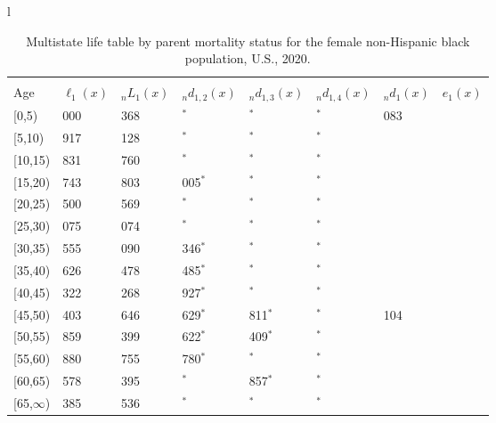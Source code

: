\documentclass[
]{article}
\begin{document}
\begin{table}
\caption{\label{tab:table-nhblack-female}Multistate life table by parent mortality status for the female non-Hispanic black population, U.S., 2020.}

\centering
\fontsize{9}{11}\selectfont
\begin{tabular}[t]{l}
\hline
\begin{tabular}{>{\raggedright\arraybackslash}p{.45in}>{\raggedleft\arraybackslash}p{.65in}>{\raggedleft\arraybackslash}p{.65in}>{\raggedleft\arraybackslash}p{.65in}>{\raggedleft\arraybackslash}p{.65in}>{\raggedleft\arraybackslash}p{.65in}>{\raggedleft\arraybackslash}p{.65in}>{\raggedleft\arraybackslash}p{.65in}}
\toprule
\multicolumn{1}{c}{ } & \multicolumn{7}{c}{(1) Lost neither} \\
\cmidrule(l{3pt}r{3pt}){2-8}
Age & $\ell_{1}(x)$ & ${}_nL_{1}(x)$ & ${}_nd_{1,2}(x)$ & ${}_nd_{1,3}(x)$ & ${}_nd_{1,4}(x)$ & ${}_nd_{1}(x)$ & $e_{1}(x)$\\
\midrule
{}[0,5) & 100 000 & 490 368 & 0$^{*}$ & 0$^{*}$ & 0$^{*}$ & 1 083 & 42\\
{}[5,10) & 98 917 & 485 128 & 0$^{*}$ & 0$^{*}$ & 0$^{*}$ & 86 & 37\\
{}[10,15) & 98 831 & 470 760 & 0$^{*}$ & 0$^{*}$ & 0$^{*}$ & 88 & 32\\
{}[15,20) & 98 743 & 437 803 & 4 005$^{*}$ & 0$^{*}$ & 0$^{*}$ & 238 & 27\\
{}[20,25) & 94 500 & 421 569 & 0$^{*}$ & 0$^{*}$ & 0$^{*}$ & 425 & 23\\
\addlinespace
{}[25,30) & 94 075 & 415 074 & 0$^{*}$ & 0$^{*}$ & 0$^{*}$ & 520 & 19\\
{}[30,35) & 93 555 & 336 090 & 13 346$^{*}$ & 0$^{*}$ & 0$^{*}$ & 583 & 15\\
{}[35,40) & 79 626 & 342 478 & 12 485$^{*}$ & 0$^{*}$ & 0$^{*}$ & 819 & 11\\
{}[40,45) & 66 322 & 290 268 & 12 927$^{*}$ & 0$^{*}$ & 0$^{*}$ & 992 & 8\\
{}[45,50) & 52 403 & 237 646 & 6 629$^{*}$ & 3 811$^{*}$ & 0$^{*}$ & 1 104 & 5\\
\addlinespace
{}[50,55) & 40 859 & 141 399 & 4 622$^{*}$ & 1 409$^{*}$ & 0$^{*}$ & 948 & 2\\
{}[55,60) & 33 880 & 51 755 & 13 780$^{*}$ & 0$^{*}$ & 0$^{*}$ & 523 & 1\\
{}[60,65) & 19 578 & 22 395 & 0$^{*}$ & 1 857$^{*}$ & 0$^{*}$ & 336 & 0\\
{}[65,$\infty$) & 17 385 & 9 536 & 0$^{*}$ & 0$^{*}$ & 0$^{*}$ & 537 & 0\\

\end{tabular}
\end{tabular}
\end{table}
\end{document}
